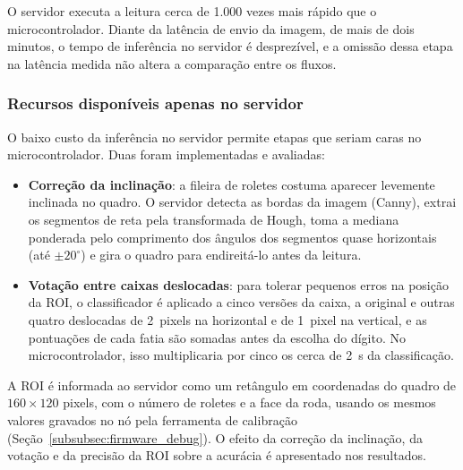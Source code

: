 O servidor executa a leitura cerca de 1.000 vezes mais rápido que o
microcontrolador. Diante da latência de envio da imagem, de mais de dois minutos, o tempo
de inferência no servidor é desprezível, e a omissão dessa etapa na latência medida não
altera a comparação entre os fluxos.

\subsubsection{Recursos disponíveis apenas no servidor}
\label{subsubsec:recursos_servidor}

O baixo custo da inferência no servidor permite etapas que seriam caras no
microcontrolador. Duas foram implementadas e avaliadas:

\begin{itemize}
    \item \textbf{Correção da inclinação}: a fileira de roletes costuma aparecer levemente
    inclinada no quadro. O servidor detecta as bordas da imagem (Canny), extrai os segmentos
    de reta pela transformada de Hough, toma a mediana ponderada pelo comprimento dos
    ângulos dos segmentos quase horizontais (até $\pm 20^\circ$) e gira o quadro para
    endireitá-lo antes da leitura.
    \item \textbf{Votação entre caixas deslocadas}: para tolerar pequenos erros na posição
    da ROI, o classificador é aplicado a cinco versões da caixa, a original e outras quatro
    deslocadas de 2~pixels na horizontal e de 1~pixel na vertical, e as pontuações de cada
    fatia são somadas antes da escolha do dígito. No microcontrolador, isso multiplicaria
    por cinco os cerca de 2~s da classificação.
\end{itemize}

A ROI é informada ao servidor como um retângulo em coordenadas do quadro de
$160 \times 120$ pixels, com o número de roletes e a face da roda, usando os mesmos valores
gravados no nó pela ferramenta de calibração
(Seção~\ref{subsubsec:firmware_debug}). O efeito da correção da inclinação, da votação e da
precisão da ROI sobre a acurácia é apresentado nos resultados.
